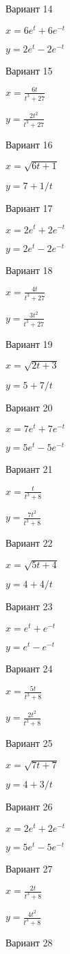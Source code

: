 \documentclass[11pt]{report}
\begin{document}
Вариант 14

$x = 6 e^{t} + 6 e^{- t}$

$y = 2 e^{t} - 2 e^{- t}$

Вариант 15

$x = \frac{6 t}{t^{3} + 27}$

$y = \frac{2 t^{2}}{t^{3} + 27}$

Вариант 16

$x = \sqrt{6 t + 1}$

$y = 7 + 1 / t$

Вариант 17

$x = 2 e^{t} + 2 e^{- t}$

$y = 2 e^{t} - 2 e^{- t}$

Вариант 18

$x = \frac{4 t}{t^{3} + 27}$

$y = \frac{3 t^{2}}{t^{3} + 27}$

Вариант 19

$x = \sqrt{2 t + 3}$

$y = 5 + 7 / t$

Вариант 20

$x = 7 e^{t} + 7 e^{- t}$

$y = 5 e^{t} - 5 e^{- t}$

Вариант 21

$x = \frac{t}{t^{3} + 8}$

$y = \frac{7 t^{2}}{t^{3} + 8}$

Вариант 22

$x = \sqrt{5 t + 4}$

$y = 4 + 4 / t$

Вариант 23

$x = e^{t} + e^{- t}$

$y = e^{t} - e^{- t}$

Вариант 24

$x = \frac{5 t}{t^{3} + 8}$

$y = \frac{2 t^{2}}{t^{3} + 8}$

Вариант 25

$x = \sqrt{7 t + 7}$

$y = 4 + 3 / t$

Вариант 26

$x = 2 e^{t} + 2 e^{- t}$

$y = 5 e^{t} - 5 e^{- t}$

Вариант 27

$x = \frac{2 t}{t^{3} + 8}$

$y = \frac{4 t^{2}}{t^{3} + 8}$

Вариант 28
\end{document}
